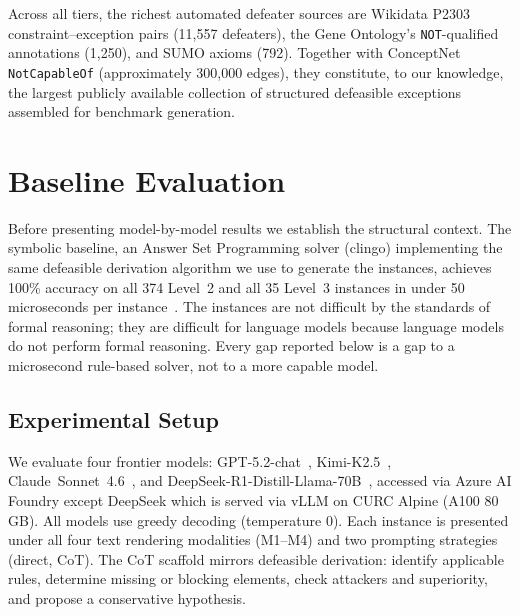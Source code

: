 \documentclass{article}
\theoremstyle{definition}
\begin{document}
Across all tiers, the richest automated defeater sources are Wikidata P2303 constraint--exception pairs (11{,}557 defeaters), the Gene Ontology's \texttt{NOT}-qualified annotations (1{,}250), and SUMO axioms (792). Together with ConceptNet \texttt{NotCapableOf} (approximately 300{,}000 edges), they constitute, to our knowledge, the largest publicly available collection of structured defeasible exceptions assembled for benchmark generation.


\section{Baseline Evaluation}\label{sec:evaluation}

Before presenting model-by-model results we establish the structural context. The symbolic baseline, an Answer Set Programming solver (clingo) implementing the same defeasible derivation algorithm we use to generate the instances, achieves 100\% accuracy on all 374 Level~2 and all 35 Level~3 instances in under 50 microseconds per instance~\citep{maher2001propositional}. The instances are not difficult by the standards of formal reasoning; they are difficult for language models because language models do not perform formal reasoning. Every gap reported below is a gap to a microsecond rule-based solver, not to a more capable model.

\subsection{Experimental Setup}\label{subsec:setup}

We evaluate four frontier models: GPT-5.2-chat~\citep{openai2025gpt52}, Kimi-K2.5~\citep{moonshot2025kimi}, Claude~Sonnet~4.6~\citep{anthropic2024claude}, and DeepSeek-R1-Distill-Llama-70B~\citep{deepseek2025r1}, accessed via Azure AI Foundry except DeepSeek which is served via vLLM on CURC Alpine (A100 80\,GB). All models use greedy decoding (temperature 0). Each instance is presented under all four text rendering modalities (M1--M4) and two prompting strategies (direct, CoT). The CoT scaffold mirrors defeasible derivation: identify applicable rules, determine missing or blocking elements, check attackers and superiority, and propose a conservative hypothesis.
\end{document}
